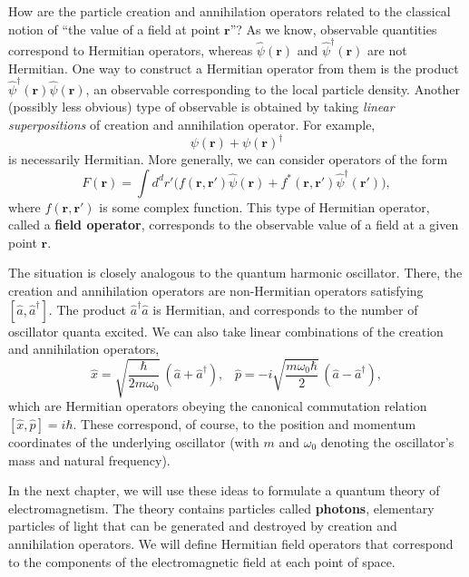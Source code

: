 \documentclass[pra,12pt]{revtex4}
\begin{document}
How are the particle creation and annihilation operators related to
the classical notion of ``the value of a field at point
$\mathbf{r}$''?  As we know, observable quantities correspond to
Hermitian operators, whereas $\hat{\psi}(\mathbf{r})$ and
$\hat{\psi}^\dagger(\mathbf{r})$ are not Hermitian.  One way to
construct a Hermitian operator from them is the product
$\hat{\psi}^\dagger(\mathbf{r})\hat{\psi}(\mathbf{r})$, an observable
corresponding to the local particle density.  Another (possibly less
obvious) type of observable is obtained by taking \textit{linear
  superpositions} of creation and annihilation operator.  For example,
$$\psi(\mathbf{r}) + \psi(\mathbf{r})^\dagger$$
is necessarily Hermitian.  More generally, we can consider operators
of the form
$$F(\mathbf{r}) = \int d^dr' \Big(f(\mathbf{r},\mathbf{r}') \hat{\psi}(\mathbf{r}) + f^*(\mathbf{r},\mathbf{r}') \hat{\psi}^\dagger(\mathbf{r}') \Big),$$
where $f(\mathbf{r},\mathbf{r}')$ is some complex function.  This type
of Hermitian operator, called a \textbf{field operator}, corresponds
to the observable value of a field at a given point $\mathbf{r}$.

The situation is closely analogous to the quantum harmonic oscillator.
There, the creation and annihilation operators are non-Hermitian
operators satisfying $[\hat{a},\hat{a}^\dagger]$.  The product
$\hat{a}^\dagger\hat{a}$ is Hermitian, and corresponds to the number
of oscillator quanta excited.  We can also take linear combinations of
the creation and annihilation operators,
$$\hat{x} = \sqrt{\frac{\hbar}{2m\omega_0}} \, \left(\hat{a}+\hat{a}^\dagger\right), \;\;\;\hat{p} = -i \sqrt{\frac{m\omega_0\hbar}{2}} \, \left(\hat{a}-\hat{a}^\dagger\right),$$
which are Hermitian operators obeying the canonical commutation
relation $[\hat{x},\hat{p}] = i\hbar$.  These correspond, of course,
to the position and momentum coordinates of the underlying oscillator
(with $m$ and $\omega_0$ denoting the oscillator's mass and natural
frequency).

In the next chapter, we will use these ideas to formulate a quantum
theory of electromagnetism.  The theory contains particles called
\textbf{photons}, elementary particles of light that can be generated
and destroyed by creation and annihilation operators.  We will define
Hermitian field operators that correspond to the components of the
electromagnetic field at each point of space.
\end{document}
